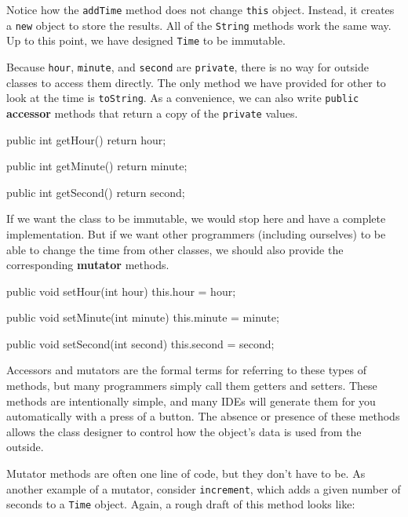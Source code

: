 \documentclass[12pt]{book}
\theoremstyle{exercise}
\newcommand{\java}[1]{\lstinline{#1}} %
\begin{document}

Notice how the \java{addTime} method does not change \java{this} object.
Instead, it creates a \java{new} object to store the results.
All of the \java{String} methods work the same way.
Up to this point, we have designed \java{Time} to be immutable.


Because \java{hour}, \java{minute}, and \java{second} are \java{private}, there is no way for outside classes to access them directly.
The only method we have provided for other to look at the time is \java{toString}.
As a convenience, we can also write \java{public} {\bf accessor} methods that return a copy of the \java{private} values.

\begin{code}
    public int getHour() {
        return hour;
    }

    public int getMinute() {
        return minute;
    }

    public int getSecond() {
        return second;
    }
\end{code}


If we want the class to be immutable, we would stop here and have a complete implementation.
But if we want other programmers (including ourselves) to be able to change the time from other classes, we should also provide the corresponding {\bf mutator} methods.

\begin{code}
    public void setHour(int hour) {
        this.hour = hour;
    }

    public void setMinute(int minute) {
        this.minute = minute;
    }

    public void setSecond(int second) {
        this.second = second;
    }
\end{code}

Accessors and mutators are the formal terms for referring to these types of methods, but many programmers simply call them getters and setters.
These methods are intentionally simple, and many IDEs will generate them for you automatically with a press of a button.
The absence or presence of these methods allows the class designer to control how the object's data is used from the outside.

Mutator methods are often one line of code, but they don't have to be.
As another example of a mutator, consider \java{increment}, which adds a given number of seconds to a \java{Time} object.
Again, a rough draft of this method looks like:
\end{document}
